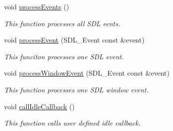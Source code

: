 \begin{DoxyCompactItemize}
void \hyperlink{classWindow_a381364c2704bed978cdf9df669c4b629}{process\+Events} ()
\begin{DoxyCompactList}\small\item\em This function processes all S\+DL eents. \end{DoxyCompactList}\item 
void \hyperlink{classWindow_a31e1886b2016544baa55bedcc4f3b48b}{process\+Event} (S\+D\+L\+\_\+\+Event const \&event)
\begin{DoxyCompactList}\small\item\em This funciton processes one S\+DL event. \end{DoxyCompactList}\item 
void \hyperlink{classWindow_a65c68d5dc2ebc68108662978e86efd25}{process\+Window\+Event} (S\+D\+L\+\_\+\+Event const \&event)
\begin{DoxyCompactList}\small\item\em This function processes one S\+DL window event. \end{DoxyCompactList}\item 
\mbox{\label{classWindow_a4a94fbab09672f8360e855ac9ba3becb}} 
void \hyperlink{classWindow_a4a94fbab09672f8360e855ac9ba3becb}{call\+Idle\+Callback} ()
\begin{DoxyCompactList}\small\item\em This function calls user defined idle callback. \end{DoxyCompactList}\end{DoxyCompactItemize}
